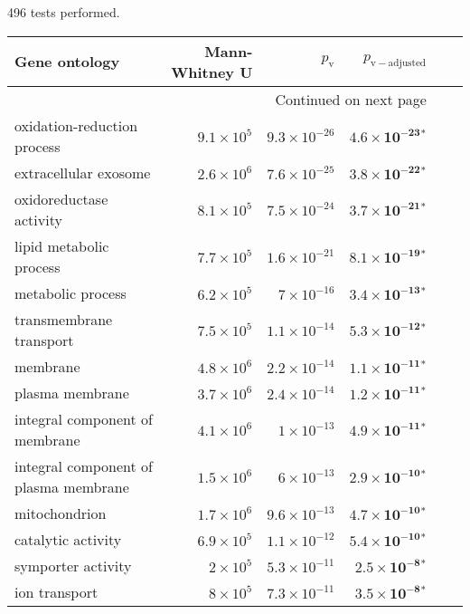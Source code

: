 496 tests performed.\scriptsize
\begin{longtable}{|l|r|r|r|r|r|}
\toprule
                             Gene ontology &     Mann-Whitney U &     $p_{\mathrm{v}}$ &      $p_{\mathrm{v-adjusted}}$ \\
\midrule
\endhead
\midrule
\multicolumn{4}{r}{{Continued on next page}} \\
\midrule
\endfoot

\bottomrule
\endlastfoot
               oxidation-reduction process & $9.1\times 10^{5}$ & $9.3\times 10^{-26}$ &  $\bm{4.6\times 10^{-23}{^*}}$ \\
                     extracellular exosome & $2.6\times 10^{6}$ & $7.6\times 10^{-25}$ &  $\bm{3.8\times 10^{-22}{^*}}$ \\
                   oxidoreductase activity & $8.1\times 10^{5}$ & $7.5\times 10^{-24}$ &  $\bm{3.7\times 10^{-21}{^*}}$ \\
                   lipid metabolic process & $7.7\times 10^{5}$ & $1.6\times 10^{-21}$ &  $\bm{8.1\times 10^{-19}{^*}}$ \\
                         metabolic process & $6.2\times 10^{5}$ &  $ 7\times 10^{-16}$ &  $\bm{3.4\times 10^{-13}{^*}}$ \\
                   transmembrane transport & $7.5\times 10^{5}$ & $1.1\times 10^{-14}$ &  $\bm{5.3\times 10^{-12}{^*}}$ \\
                                  membrane & $4.8\times 10^{6}$ & $2.2\times 10^{-14}$ &  $\bm{1.1\times 10^{-11}{^*}}$ \\
                           plasma membrane & $3.7\times 10^{6}$ & $2.4\times 10^{-14}$ &  $\bm{1.2\times 10^{-11}{^*}}$ \\
            integral component of membrane & $4.1\times 10^{6}$ &  $ 1\times 10^{-13}$ &  $\bm{4.9\times 10^{-11}{^*}}$ \\
     integral component of plasma membrane & $1.5\times 10^{6}$ &  $ 6\times 10^{-13}$ &  $\bm{2.9\times 10^{-10}{^*}}$ \\
                             mitochondrion & $1.7\times 10^{6}$ & $9.6\times 10^{-13}$ &  $\bm{4.7\times 10^{-10}{^*}}$ \\
                        catalytic activity & $6.9\times 10^{5}$ & $1.1\times 10^{-12}$ &  $\bm{5.4\times 10^{-10}{^*}}$ \\
                        symporter activity &  $ 2\times 10^{5}$ & $5.3\times 10^{-11}$ &   $\bm{2.5\times 10^{-8}{^*}}$ \\
                             ion transport &  $ 8\times 10^{5}$ & $7.3\times 10^{-11}$ &   $\bm{3.5\times 10^{-8}{^*}}$ \\

\end{longtable}
